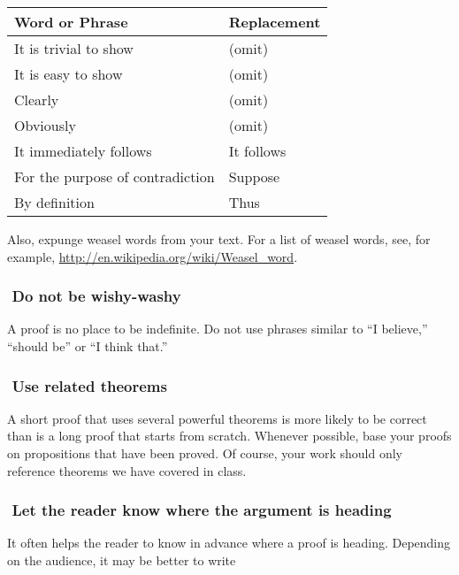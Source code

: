 \documentclass[12pt]{article}
\newcounter{ex}\setcounter{ex}{0}
\newcommand{\ex}{%
\hspace{-0.2in} \setcounter{ex}{\value{ex}+1}
\theex \,\,}
\newcounter{se}\setcounter{se}{0}
\begin{document}
\begin{center}
\begin{tabular}{| l l |}
\hline  \textbf {Word or Phrase} &  \textbf {\textbf{Replace}ment} \\ 
\hline
It is trivial to show    & (omit) \\
It is easy to show     & (omit) \\   
Clearly   & (omit) \\
Obviously  & (omit) \\
It immediately follows & It follows \\
For the purpose of contradiction &  Suppose \\
By definition                    & Thus \\
\hline
\end{tabular}
\end{center}
Also, expunge weasel words from your text. For a list of weasel words,  see, for example,  
\url{http://en.wikipedia.org/wiki/Weasel_word}.




\subsubsection*{\ex  Do not be wishy-washy}  

A proof is no place to be indefinite.  Do not use  phrases similar 
to ``I believe,'' ``should be'' or ``I think that.''





\subsubsection*{\ex  Use related theorems}  

A short proof that uses several powerful theorems is more likely to be
correct than is a long proof that starts from scratch.  Whenever
possible, base your proofs on propositions that have been proved.  Of
course, your work should only reference theorems we have covered in class.

\subsubsection*{\ex  Let the reader know where the argument is heading} 

It often helps the reader to know in advance where a proof is heading.
Depending on the audience, it may be better to write
\end{document}
